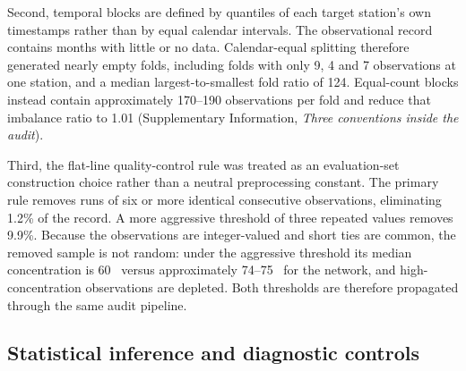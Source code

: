 Second, temporal blocks are defined by quantiles of each target station's own timestamps rather than by equal calendar intervals. The observational record contains months with little or no data. Calendar-equal splitting therefore generated nearly empty folds, including folds with only 9, 4 and 7 observations at one station, and a median largest-to-smallest fold ratio of 124. Equal-count blocks instead contain approximately 170--190 observations per fold and reduce that imbalance ratio to 1.01 (Supplementary Information, \emph{Three conventions inside the audit}).

Third, the flat-line quality-control rule was treated as an evaluation-set construction choice rather than a neutral preprocessing constant. The primary rule removes runs of six or more identical consecutive observations, eliminating 1.2\% of the record. A more aggressive threshold of three repeated values removes 9.9\%. Because the observations are integer-valued and short ties are common, the removed sample is not random: under the aggressive threshold its median concentration is 60~\ugm{} versus approximately 74--75~\ugm{} for the network, and high-concentration observations are depleted. Both thresholds are therefore propagated through the same audit pipeline.

\subsection{Statistical inference and diagnostic controls}

